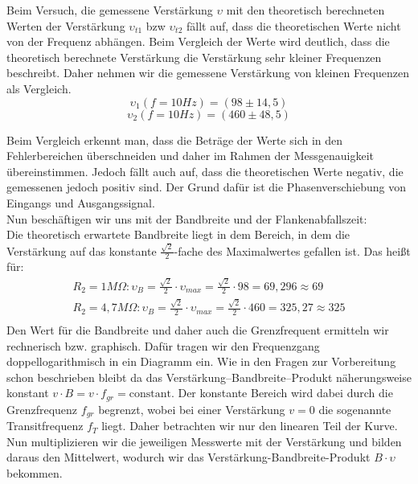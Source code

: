 Beim Versuch, die gemessene Verstärkung $\upsilon$ mit den theoretisch berechneten Werten der Verstärkung  $\upsilon_{t1}$ bzw $\upsilon_{t2}$ fällt auf, dass die theoretischen Werte nicht von der Frequenz abhängen. Beim Vergleich der Werte wird deutlich, dass die theoretisch berechnete Verstärkung die Verstärkung sehr kleiner Frequenzen beschreibt. Daher nehmen wir die gemessene Verstärkung von kleinen Frequenzen als Vergleich. 
\begin{equation}
\upsilon_1(f=10Hz)=(98\pm 14,5)
\end{equation}
\begin{equation}
\upsilon_2(f=10Hz)=(460\pm 48,5)
\end{equation}

Beim Vergleich erkennt man, dass die Beträge der Werte sich in den Fehlerbereichen überschneiden und daher im Rahmen der Messgenauigkeit übereinstimmen. Jedoch fällt auch auf, dass die theoretischen Werte negativ, die gemessenen jedoch positiv sind. Der Grund dafür ist die Phasenverschiebung von Eingangs und Ausgangssignal. \\





Nun beschäftigen wir uns mit der Bandbreite und der Flankenabfallszeit:\\
Die theoretisch erwartete Bandbreite liegt in dem Bereich, in dem die Verstärkung auf das konstante $\frac{\sqrt{2} }{2}$-fache des Maximalwertes gefallen ist. Das heißt für:\\
\begin{align}
R_2=1M\Omega: \upsilon_B=\frac{\sqrt{2}}{2}\cdot \upsilon_{max}=\frac{\sqrt{2} }{2}\cdot 98=69,296\approx 69\\
R_2=4,7M\Omega: \upsilon_B=\frac{\sqrt{2}}{2}\cdot \upsilon_{max}=\frac{\sqrt{2}}{2}\cdot460 =325,27\approx 325\\
\end{align}
Den Wert für die Bandbreite und daher auch die Grenzfrequent ermitteln wir rechnerisch bzw. graphisch. Dafür tragen wir den Frequenzgang doppellogarithmisch in ein Diagramm ein. Wie in den Fragen zur Vorbereitung schon beschrieben bleibt da das Verstärkung–Bandbreite–Produkt näherungsweise konstant $v\cdot B = v \cdot f_{gr} = \text{constant}$. Der konstante Bereich wird dabei durch die Grenzfrequenz $f_{gr}$ begrenzt, wobei bei einer Verstärkung $v=0$ die sogenannte Transitfrequenz $f_T$ liegt. Daher betrachten wir nur den linearen Teil der Kurve. Nun multiplizieren wir die jeweiligen Messwerte mit der Verstärkung und bilden daraus den Mittelwert, wodurch wir das Verstärkung-Bandbreite-Produkt $B\cdot \upsilon$ bekommen. 

